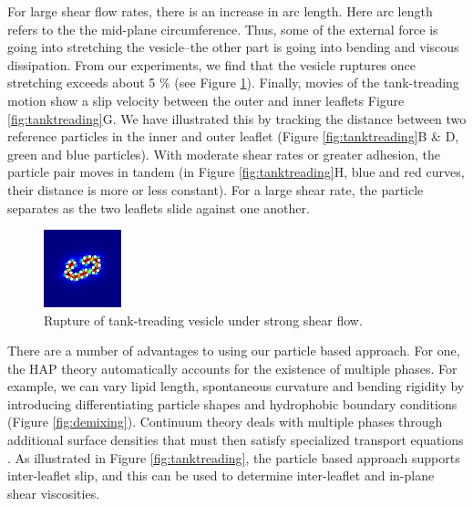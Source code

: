 For large shear flow rates, there is an increase in arc length. Here arc length
refers to the the mid-plane circumference. Thus,
some of the external force is going into stretching the vesicle--the other
part is going into bending and viscous dissipation. From our experiments, 
we find that the vesicle ruptures once stretching exceeds about 5 \%
(see Figure \ref{fig:rupture}).
Finally, movies of the tank-treading motion show a slip velocity
between the outer and inner leaflets Figure \ref{fig:tanktreading}G. We have illustrated this 
by tracking the distance between two reference particles in the inner and outer leaflet
(Figure \ref{fig:tanktreading}B \& D, green and blue particles). 
With moderate shear rates or greater adhesion, the particle pair moves in tandem
(in Figure \ref{fig:tanktreading}H, blue and red curves, their distance is more or less constant). 
For a large shear rate, the particle separates as the two leaflets slide against one another. 



\begin{figure}
\centerline{\includegraphics[width=0.2\textwidth]{figures/PW_fig5.pdf}}
\caption{\label{fig:rupture} Rupture of tank-treading vesicle under strong shear flow.}
\end{figure}
There are a number of advantages to using our particle based approach.
For one, the HAP theory automatically accounts for the existence of multiple phases. 
For example, we can vary lipid length, spontaneous curvature and bending rigidity 
by introducing differentiating particle shapes and hydrophobic boundary conditions (Figure \ref{fig:demixing}).
Continuum theory deals with multiple phases through additional surface densities that must
then satisfy specialized transport equations \cite{Lowengrub07,MikuckiZhou17}. 
As illustrated in Figure \ref{fig:tanktreading}, the particle
based approach supports inter-leaflet slip, and this can be used to determine inter-leaflet
and in-plane shear viscosities. 





